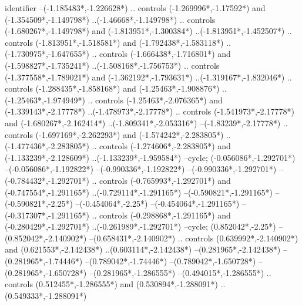 {\begin{scope}[x=1mm,y=1mm,line width=\SCstroke mm,line cap=round,line join=round]
\begin{SCpart}{identifier}
--({-1.185483*\SCF},{-1.226628*\SCF})
.. controls ({-1.269996*\SCF},{-1.17592*\SCF}) and ({-1.354509*\SCF},{-1.149798*\SCF}) ..({-1.46668*\SCF},{-1.149798*\SCF})
.. controls ({-1.680267*\SCF},{-1.149798*\SCF}) and ({-1.813951*\SCF},{-1.300384*\SCF}) ..({-1.813951*\SCF},{-1.452507*\SCF})
.. controls ({-1.813951*\SCF},{-1.518581*\SCF}) and ({-1.792438*\SCF},{-1.583118*\SCF}) ..({-1.730975*\SCF},{-1.647655*\SCF})
.. controls ({-1.666438*\SCF},{-1.716801*\SCF}) and ({-1.598827*\SCF},{-1.735241*\SCF}) ..({-1.508168*\SCF},{-1.756753*\SCF})
.. controls ({-1.377558*\SCF},{-1.789021*\SCF}) and ({-1.362192*\SCF},{-1.793631*\SCF}) ..({-1.319167*\SCF},{-1.832046*\SCF})
.. controls ({-1.288435*\SCF},{-1.858168*\SCF}) and ({-1.25463*\SCF},{-1.908876*\SCF}) ..({-1.25463*\SCF},{-1.974949*\SCF})
.. controls ({-1.25463*\SCF},{-2.076365*\SCF}) and ({-1.339143*\SCF},{-2.17778*\SCF}) ..({-1.478973*\SCF},{-2.17778*\SCF})
.. controls ({-1.541973*\SCF},{-2.17778*\SCF}) and ({-1.680267*\SCF},{-2.162414*\SCF}) ..({-1.809341*\SCF},{-2.053316*\SCF})
--({-1.83239*\SCF},{-2.17778*\SCF})
.. controls ({-1.697169*\SCF},{-2.262293*\SCF}) and ({-1.574242*\SCF},{-2.283805*\SCF}) ..({-1.477436*\SCF},{-2.283805*\SCF})
.. controls ({-1.274606*\SCF},{-2.283805*\SCF}) and ({-1.133239*\SCF},{-2.128609*\SCF}) ..({-1.133239*\SCF},{-1.959584*\SCF})
--cycle;
 ({-0.056086*\SCF},{-1.292701*\SCF})
--({-0.056086*\SCF},{-1.192822*\SCF})
--({-0.990336*\SCF},{-1.192822*\SCF})
--({-0.990336*\SCF},{-1.292701*\SCF})
--({-0.784432*\SCF},{-1.292701*\SCF})
.. controls ({-0.765993*\SCF},{-1.292701*\SCF}) and ({-0.747554*\SCF},{-1.291165*\SCF}) ..({-0.729114*\SCF},{-1.291165*\SCF})
--({-0.590821*\SCF},{-1.291165*\SCF})
--({-0.590821*\SCF},{-2.25*\SCF})
--({-0.454064*\SCF},{-2.25*\SCF})
--({-0.454064*\SCF},{-1.291165*\SCF})
--({-0.317307*\SCF},{-1.291165*\SCF})
.. controls ({-0.298868*\SCF},{-1.291165*\SCF}) and ({-0.280429*\SCF},{-1.292701*\SCF}) ..({-0.261989*\SCF},{-1.292701*\SCF})
--cycle;
 ({0.852042*\SCF},{-2.25*\SCF})
--({0.852042*\SCF},{-2.140902*\SCF})
--({0.658431*\SCF},{-2.140902*\SCF})
.. controls ({0.639992*\SCF},{-2.140902*\SCF}) and ({0.621553*\SCF},{-2.142438*\SCF}) ..({0.603114*\SCF},{-2.142438*\SCF})
--({0.281965*\SCF},{-2.142438*\SCF})
--({0.281965*\SCF},{-1.74446*\SCF})
--({0.789042*\SCF},{-1.74446*\SCF})
--({0.789042*\SCF},{-1.650728*\SCF})
--({0.281965*\SCF},{-1.650728*\SCF})
--({0.281965*\SCF},{-1.286555*\SCF})
--({0.494015*\SCF},{-1.286555*\SCF})
.. controls ({0.512455*\SCF},{-1.286555*\SCF}) and ({0.530894*\SCF},{-1.288091*\SCF}) ..({0.549333*\SCF},{-1.288091*\SCF})

\end{SCpart}
\end{scope}}
